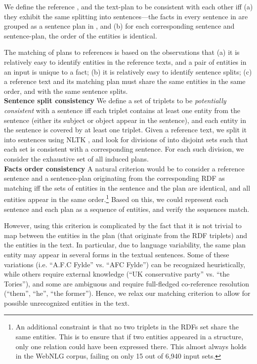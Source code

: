 \documentclass[11pt,a4paper]{article}
\begin{document}
We define the reference , and the text-plan  to be consistent with each other iff (a) they exhibit the same splitting into sentences---the facts in every sentence in  are grouped as a sentence plan in , and (b) for each corresponding sentence and sentence-plan, the order of the entities is identical.

The matching of plans to references is based on the observations that (a) it is relatively easy to identify entities in the reference texts, and a pair of entities in an input is unique to a fact; (b) it is relatively easy to identify sentence splits; (c) a reference text and its matching plan must share the same entities in the same order, and with the same sentence splits.\\
\textbf{Sentence split consistency }
We define a set of triplets to be \emph{potentially consistent} with a sentence
iff each triplet contains at least one entity from the sentence (either its subject or object appear in the sentence), and each entity in the sentence is covered by at least one triplet.
Given a reference text, we split it into sentences using NLTK \cite{bird2004nltk}, and look for divisions of  into disjoint sets such that each set is consistent with a corresponding sentence. For each such division, we consider the exhaustive set of all induced plans.\\
\textbf{Facts order consistency } 
A natural criterion would be to consider a reference sentence and a sentence-plan originating from the corresponding RDF as matching iff the sets of entities in the sentence and the plan are identical, and all entities appear in the  same order.\footnote{An additional constraint is that no two triplets in the RDFs set share the same entities. This is to ensure that if two entities appeared in a structure, only one relation could have been expressed there. This almost always holds in the WebNLG corpus, failing on only 15 out of 6,940 input sets.}
Based on this, we could represent each sentence and each plan as a sequence of entities, and verify the sequences match.

However, using this criterion is complicated by the fact that it is not trivial to map between the entities in the plan (that originate from the RDF triplets) and the entities in the text. In particular, due to language variability, the same plan entity may appear in several forms in the textual sentences. Some of these variations (i.e. ``A.F.C Fylde'' vs.  ``AFC Fylde'') can be recognized heuristically, while others require external knowledge (``UK conservative party'' vs. ``the Tories''), and some are ambiguous and require full-fledged co-reference resolution (``them'', ``he'', ``the former''). Hence, we relax our matching criterion to allow for possible unrecognized entities in the text.
\end{document}
